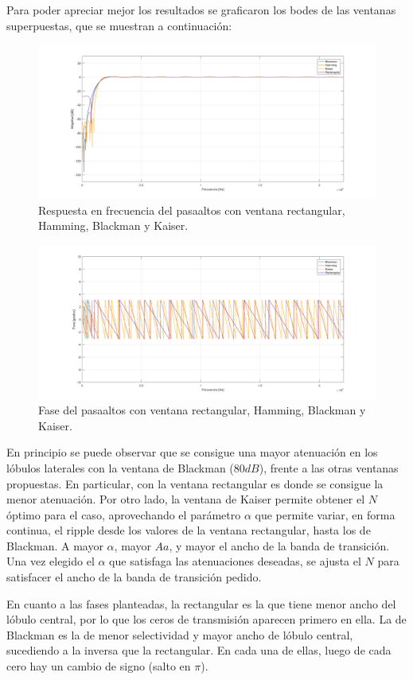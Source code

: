 Para poder apreciar mejor los resultados se graficaron los bodes de las ventanas superpuestas, que se muestran a continuación:
\begin{figure}[H]
  \centering
  \includegraphics[scale=.35]{./images/1/modulos.png}
  \caption{Respuesta en frecuencia del pasaaltos con ventana rectangular, Hamming, Blackman y Kaiser.}
\end{figure}
\begin{figure}[H]
  \centering
  \includegraphics[scale=.35]{./images/1/fases.png}
  \caption{Fase del pasaaltos con ventana rectangular, Hamming, Blackman y Kaiser.}
\end{figure}

En principio se puede observar que se consigue una mayor atenuación en los lóbulos laterales con la ventana de Blackman ($80dB$), frente a las otras ventanas propuestas. En particular, con la ventana rectangular es donde se consigue la menor atenuación. Por otro lado, la ventana de Kaiser permite obtener el $N$ óptimo para el caso, aprovechando el parámetro $\alpha$ que permite variar, en forma continua, el ripple desde los valores de la ventana rectangular, hasta los de Blackman. A mayor $\alpha$, mayor $Aa$, y mayor el ancho de la banda de transición. Una vez elegido el $\alpha$ que satisfaga las atenuaciones deseadas, se ajusta el $N$ para satisfacer el ancho de la banda de transición pedido.
\par En cuanto a las fases planteadas, la rectangular es la que tiene menor ancho del lóbulo central, por lo que los ceros de transmisión aparecen primero en ella. La de Blackman es la de menor selectividad y mayor ancho de lóbulo central, sucediendo a la inversa que la rectangular. En cada  una de ellas, luego de cada cero hay un cambio de signo (salto en $\pi$).
